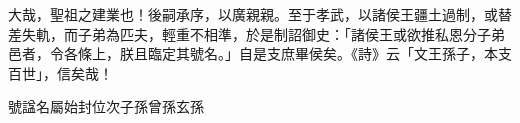
\begin{pinyinscope}
大哉，聖祖之建業也！後嗣承序，以廣親親。至于孝武，以諸侯王疆土過制，或替差失軌，而子弟為匹夫，輕重不相準，於是制詔御史：「諸侯王或欲推私恩分子弟邑者，令各條上，朕且臨定其號名。」自是支庶畢侯矣。《詩》云「文王孫子，本支百世」，信矣哉！

號諡名屬始封位次子孫曾孫玄孫


\end{pinyinscope}